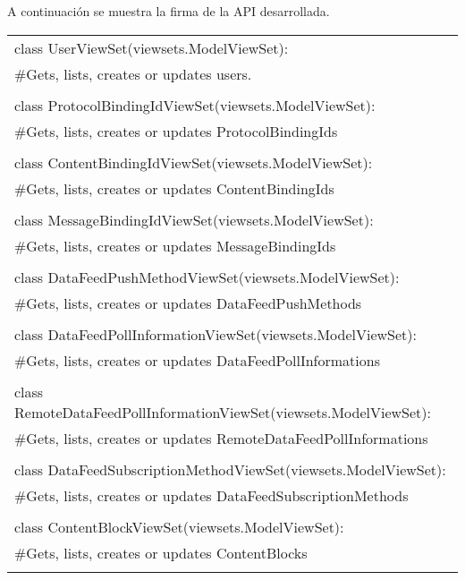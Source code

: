 	A continuación se muestra la firma de la API desarrollada.
	\begin{center}
		\begin{tabular}{|l|}
			\hline
			class UserViewSet(viewsets.ModelViewSet):\\
			\#Gets, lists, creates or updates users.\\ \\
			
			class ProtocolBindingIdViewSet(viewsets.ModelViewSet):\\
			\#Gets, lists, creates or updates ProtocolBindingIds\\ \\
			
			class ContentBindingIdViewSet(viewsets.ModelViewSet):\\
			\#Gets, lists, creates or updates ContentBindingIds\\ \\
			
			class MessageBindingIdViewSet(viewsets.ModelViewSet):\\
			\#Gets, lists, creates or updates MessageBindingIds\\ \\
			
			class DataFeedPushMethodViewSet(viewsets.ModelViewSet):\\
			\#Gets, lists, creates or updates DataFeedPushMethods\\ \\
			
			class DataFeedPollInformationViewSet(viewsets.ModelViewSet):\\
			\#Gets, lists, creates or updates DataFeedPollInformations\\ \\
			
			class RemoteDataFeedPollInformationViewSet(viewsets.ModelViewSet):\\
			\#Gets, lists, creates or updates RemoteDataFeedPollInformations\\ \\
			
			class DataFeedSubscriptionMethodViewSet(viewsets.ModelViewSet):\\
			\#Gets, lists, creates or updates DataFeedSubscriptionMethods\\ \\
			
			class ContentBlockViewSet(viewsets.ModelViewSet):\\
			\#Gets, lists, creates or updates ContentBlocks\\ \\
			

\end{tabular}
\end{center}
